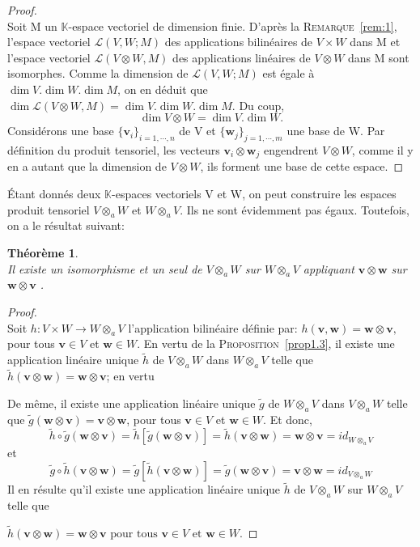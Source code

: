 \documentclass[11pt,a4paper,oneside]{book}
\newtheorem{theo}{Théorème}[chapter]
\newtheorem{proof}{Démonstration}
\def\K{\mathbb K}
\def\L{\mathcal L}
\def\v{\mathbf v}
\def\w{\mathbf w}
\newcommand{\propref}[1]{\textsc{Proposition}~\ref{#1}}
\newcommand{\remref}[1]{\textsc{Remarque}~\ref{#1}}
\begin{document}
\begin{proof}
	\emph{\\}
Soit M un $ \K $-espace vectoriel de dimension finie. D'après la  \remref{rem:1}, l'espace vectoriel $ \L(V,W;M) $ des applications bilinéaires de $ V\times W $ dans  M  et l'espace vectoriel $ \L(V\otimes W,M) $ des applications linéaires de $ V\otimes W $ dans M sont isomorphes. Comme la dimension de $ \L(V,W;M) $ est égale à $ \dim V.\dim W.\dim M $, on en déduit que $ \dim \L(V\otimes W,M)=\dim V.\dim W.\dim M  $. Du coup,
\begin{equation}
\dim V\otimes W=\dim V. \dim W.
\end{equation}
Considérons une base $ \{\v_{i}\}_{i=1,\cdots,n} $ de V et $ \{\w_{j}\}_{j=1,\cdots,m} $ une base de W. Par définition du produit tensoriel, les vecteurs $ \v_{i}\otimes \w_{j} $ engendrent $ V\otimes W $, comme il y en a autant que la dimension de $ V\otimes W $, ils forment une base de cette espace.
\end{proof}
Étant donnés deux $ \K $-espaces vectoriels V et W, on peut construire les espaces produit tensoriel $ V\otimes_{a}W $ et $ W\otimes_{a} V $. Ils ne sont évidemment pas égaux. Toutefois, on a le résultat suivant:
\begin{theo}
\emph{\\}
Il existe un isomorphisme et un seul de $ V\otimes_{a} W $ sur $ W\otimes_{a} V $
appliquant $ \v\otimes \w $ sur $ \w\otimes \v $ \cite[p.13]{Awanegeo}.
\end{theo} 
\begin{proof}
\emph{\\}
Soit $ h:V\times W\rightarrow W\otimes_{a} V $ l'application bilinéaire définie par: $ h(\v,\w)=\w\otimes \v, $ pour tous $ \v\in V $ et $ \w\in W $. En vertu de la \propref{prop1.3}, il existe une application linéaire unique $ \tilde{h} $ de $ V\otimes_{a} W $ dans $ W\otimes_{a} V $ telle que $\tilde{h}(\v\otimes \w)=\w\otimes \v$; en vertu 

De même, il existe une application linéaire unique $ \tilde{g} $ de $ W\otimes_{a} V $ dans $ V\otimes_{a} W $ telle que   $\tilde{g}(\w\otimes \v)=\v\otimes \w$,
 pour tous $ \v\in V $ et $ \w\in W. $ Et donc,
 $$\tilde{h}\circ \tilde{g}(\w\otimes \v)=\tilde{h}[\tilde{g}(\w\otimes \v)]=\tilde{h}(\v\otimes \w) =\w\otimes \v=id_{W\otimes_{a} V}$$ et 
  $$\tilde{g}\circ \tilde{h}(\v\otimes \w)=\tilde{g}[\tilde{h}(\v\otimes \w)]=\tilde{g}(\w\otimes \v) =\v\otimes \w=id_{V\otimes_{a} W}$$
  Il en résulte qu'il existe une application linéaire unique $ \tilde{h} $ de $ V\otimes_{a} W $ sur $ W\otimes_{a} V $ telle que
  
   $\tilde{h}(\v\otimes \w)=\w\otimes \v \text{ pour tous }  \v\in V  \text{ et } \w\in W. $
\end{proof}
\end{document}
